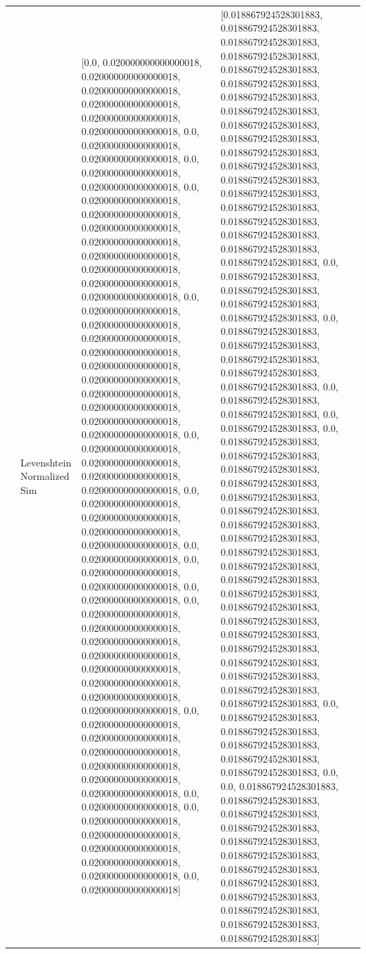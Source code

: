 \begin{tabular}{llll}
 & Levenshtein Normalized Sim & [0.0, 0.020000000000000018, 0.020000000000000018, 0.020000000000000018, 0.020000000000000018, 0.020000000000000018, 0.020000000000000018, 0.0, 0.020000000000000018, 0.020000000000000018, 0.0, 0.020000000000000018, 0.020000000000000018, 0.0, 0.020000000000000018, 0.020000000000000018, 0.020000000000000018, 0.020000000000000018, 0.020000000000000018, 0.020000000000000018, 0.020000000000000018, 0.020000000000000018, 0.0, 0.020000000000000018, 0.020000000000000018, 0.020000000000000018, 0.020000000000000018, 0.020000000000000018, 0.020000000000000018, 0.020000000000000018, 0.020000000000000018, 0.020000000000000018, 0.020000000000000018, 0.0, 0.020000000000000018, 0.020000000000000018, 0.020000000000000018, 0.020000000000000018, 0.0, 0.020000000000000018, 0.020000000000000018, 0.020000000000000018, 0.020000000000000018, 0.0, 0.020000000000000018, 0.0, 0.020000000000000018, 0.020000000000000018, 0.0, 0.020000000000000018, 0.0, 0.020000000000000018, 0.020000000000000018, 0.020000000000000018, 0.020000000000000018, 0.020000000000000018, 0.020000000000000018, 0.020000000000000018, 0.020000000000000018, 0.0, 0.020000000000000018, 0.020000000000000018, 0.020000000000000018, 0.020000000000000018, 0.020000000000000018, 0.020000000000000018, 0.0, 0.020000000000000018, 0.0, 0.020000000000000018, 0.020000000000000018, 0.020000000000000018, 0.020000000000000018, 0.020000000000000018, 0.0, 0.020000000000000018] & [0.018867924528301883, 0.018867924528301883, 0.018867924528301883, 0.018867924528301883, 0.018867924528301883, 0.018867924528301883, 0.018867924528301883, 0.018867924528301883, 0.018867924528301883, 0.018867924528301883, 0.018867924528301883, 0.018867924528301883, 0.018867924528301883, 0.018867924528301883, 0.018867924528301883, 0.018867924528301883, 0.018867924528301883, 0.018867924528301883, 0.018867924528301883, 0.0, 0.018867924528301883, 0.018867924528301883, 0.018867924528301883, 0.018867924528301883, 0.0, 0.018867924528301883, 0.018867924528301883, 0.018867924528301883, 0.018867924528301883, 0.018867924528301883, 0.0, 0.018867924528301883, 0.018867924528301883, 0.0, 0.018867924528301883, 0.0, 0.018867924528301883, 0.018867924528301883, 0.018867924528301883, 0.018867924528301883, 0.018867924528301883, 0.018867924528301883, 0.018867924528301883, 0.018867924528301883, 0.018867924528301883, 0.018867924528301883, 0.018867924528301883, 0.018867924528301883, 0.018867924528301883, 0.018867924528301883, 0.018867924528301883, 0.018867924528301883, 0.018867924528301883, 0.018867924528301883, 0.018867924528301883, 0.018867924528301883, 0.0, 0.018867924528301883, 0.018867924528301883, 0.018867924528301883, 0.018867924528301883, 0.018867924528301883, 0.0, 0.0, 0.018867924528301883, 0.018867924528301883, 0.018867924528301883, 0.018867924528301883, 0.018867924528301883, 0.018867924528301883, 0.018867924528301883, 0.018867924528301883, 0.018867924528301883, 0.018867924528301883, 0.018867924528301883, 0.018867924528301883] \\

\end{tabular}
